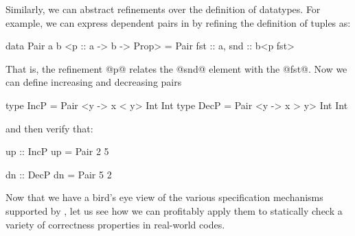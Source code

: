 Similarly, we can abstract refinements over the definition of datatypes.
For example, we can express dependent pairs in \toolname by refining the 
definition of tuples as:
%
\begin{code}
  data Pair a b <p :: a -> b -> Prop> 
    = Pair { fst :: a, snd :: b<p fst>}
\end{code}
%
That is, the refinement @p@ relates the @snd@ element with the @fst@.
Now we can define increasing and decreasing pairs
%
\begin{code}
  type IncP = Pair <{\x y -> x < y}> Int Int
  type DecP = Pair <{\x y -> x > y}> Int Int
\end{code}
%
and then verify that:
%
\begin{code}
  up :: IncP
  up = Pair 2 5
  
  dn :: DecP
  dn = Pair 5 2
\end{code}
%
Now that we have a bird's eye view of the various specification mechanisms
supported by \toolname, let us see how we can profitably apply them to
statically check a variety of correctness properties in real-world codes.

